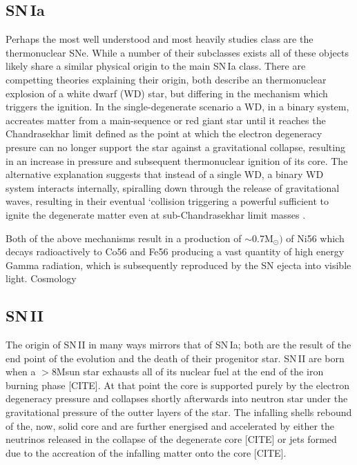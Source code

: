 \subsection{SN\,Ia}
Perhaps the most well understood and most heavily studies class are the thermonuclear SNe. While a number of their subclasses exists \citep[amongst others: SN\,.Ia, SN\'Iax, SN\,Ia-91T, SN\,Ia-91bg][]{Alsabti2017} all of these objects likely share a similar physical origin to the main SN\,Ia class. There are competting theories explaining their origin, both describe an thermonuclear explosion of a white dwarf (WD) star, but differing in the mechanism which triggers the ignition. In the single-degenerate scenario \citep{Whelan1973} a WD, in a binary system, accreates matter from a main-sequence or red giant star until it reaches the Chandrasekhar limit defined as the point at which the electron degeneracy presure can no longer support the star against a gravitational collapse, resulting in an increase in pressure and subsequent thermonuclear ignition of its core. The alternative explanation suggests that instead of a single WD, a binary WD system interacts internally, spiralling down through the release of gravitational waves, resulting in their eventual `collision triggering a powerful sufficient to ignite the degenerate matter even at sub-Chandrasekhar limit masses \citep{Iben1984}.

Both of the above mechanisms result in a production of $\sim$0.7M$_\odot)$ of Ni56 \citep{Scalzo2014} which decays radioactively to Co56 and Fe56 producing a vast quantity of high energy Gamma radiation, which is subsequently reproduced by the SN ejecta into visible light. Cosmology

\subsection{SN\,II}
The origin of SN\,II in many ways mirrors that of SN\,Ia; both are the result of the end point of the evolution and the death of their progenitor star. SN\,II are born when a $>$8Msun star exhausts all of its nuclear fuel at the end of the iron burning phase [CITE]. At that point the core is supported purely by the electron degeneracy pressure and collapses shortly afterwards into neutron star under the gravitational pressure of the outter layers of the star. The infalling shells rebound of the, now, solid core and are further energised and accelerated by either the neutrinos released in the collapse of the degenerate core [CITE] or jets formed due to the accreation of the infalling matter onto the core [CITE].

